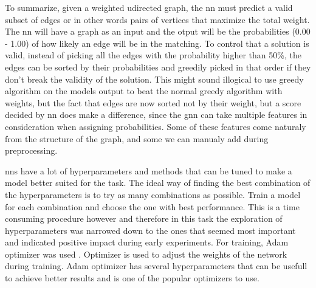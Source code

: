 To summarize, given a weighted udirected graph, the \gls{nn} must predict  a valid subset of edges or in other words pairs of vertices that maximize the total weight. The \gls{nn} will have a graph as an input and the otput will be the probabilities (0.00 - 1.00) of how likely an edge will be in the matching. To control that a solution is valid, instead of picking all the edges with the probability higher than 50\%, the edges can be sorted by their probabilities and greedily picked in that order if they don't break the validity of the solution. This might sound illogical to use greedy algorithm on the models output to beat the normal greedy algorithm with weights, but the fact that edges are now sorted not by their weight, but a score decided by \gls{nn} does make a difference, since the \gls{gnn} can take multiple features in consideration when assigning probabilities. Some of these features come naturaly from the structure of the graph, and some we can manualy add during preprocessing. 

\gls{nn}s have a lot of hyperparameters and methods that can be tuned to make a model better suited for the task. The ideal way of finding the best combination of the hyperparameters is to try as many combinations as possible. Train a model for each combination and choose the one with best performance. This is a time consuming procedure however and therefore in this task the exploration of hyperparameters was narrowed down to the ones that seemed most important and indicated positive impact during early experiments. For training, Adam optimizer was used \cite{kingma2017adam}. Optimizer is used to adjust the weights of the network during training. Adam optimizer has several hyperparameters that can be usefull to achieve better results and is one of the popular optimizers to use.

